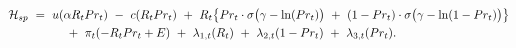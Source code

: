 \begin{equation}
\begin{split}
    \mathcal{H}_{sp} \ 
    & = \ u(\alpha R_{t} Pr_{t}) \ - \ c(R_{t} Pr_{t}) \ + \ R_{t} \big\{ Pr_{t} \cdot \sigma \big( \gamma - \ln(Pr_{t}) \big) \ + \ (1 - Pr_{t}) \cdot \sigma \big( \gamma - \ln( 1 - Pr_{t}) \big) \big\} \\
    & \hspace{1.0cm} + \ \pi_{t} (-R_{t}Pr_{t} + E) \ + \ \lambda_{1,t} (R_{t}) \ + \ \lambda_{2,t} (1 - Pr_{t}) \ + \ \lambda_{3,t} (Pr_{t}).
\end{split}
\label{Equation:Social-Planners-Problem_Hamiltonian-Lagrangian}
\end{equation}